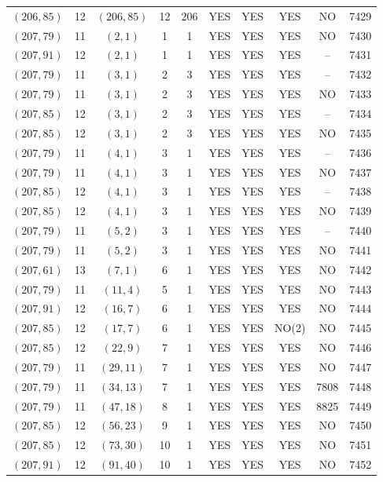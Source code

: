 \begin{longtable}{|c|c|c|c|c|c|c|c|c|c|}
$(206, 85)$ & 12 & $(206, 85)$ & 12 & 206 & YES & YES & YES & NO & 7429\\
$(207, 79)$ & 11 & $(2, 1)$ & 1 & 1 & YES & YES & YES & NO & 7430\\
$(207, 91)$ & 12 & $(2, 1)$ & 1 & 1 & YES & YES & YES & -- & 7431\\
$(207, 79)$ & 11 & $(3, 1)$ & 2 & 3 & YES & YES & YES & -- & 7432\\
$(207, 79)$ & 11 & $(3, 1)$ & 2 & 3 & YES & YES & YES & NO & 7433\\
$(207, 85)$ & 12 & $(3, 1)$ & 2 & 3 & YES & YES & YES & -- & 7434\\
$(207, 85)$ & 12 & $(3, 1)$ & 2 & 3 & YES & YES & YES & NO & 7435\\
$(207, 79)$ & 11 & $(4, 1)$ & 3 & 1 & YES & YES & YES & -- & 7436\\
$(207, 79)$ & 11 & $(4, 1)$ & 3 & 1 & YES & YES & YES & NO & 7437\\
$(207, 85)$ & 12 & $(4, 1)$ & 3 & 1 & YES & YES & YES & -- & 7438\\
$(207, 85)$ & 12 & $(4, 1)$ & 3 & 1 & YES & YES & YES & NO & 7439\\
$(207, 79)$ & 11 & $(5, 2)$ & 3 & 1 & YES & YES & YES & -- & 7440\\
$(207, 79)$ & 11 & $(5, 2)$ & 3 & 1 & YES & YES & YES & NO & 7441\\
$(207, 61)$ & 13 & $(7, 1)$ & 6 & 1 & YES & YES & YES & NO & 7442\\
$(207, 79)$ & 11 & $(11, 4)$ & 5 & 1 & YES & YES & YES & NO & 7443\\
$(207, 91)$ & 12 & $(16, 7)$ & 6 & 1 & YES & YES & YES & NO & 7444\\
$(207, 85)$ & 12 & $(17, 7)$ & 6 & 1 & YES & YES & NO(2) & NO & 7445\\
$(207, 85)$ & 12 & $(22, 9)$ & 7 & 1 & YES & YES & YES & NO & 7446\\
$(207, 79)$ & 11 & $(29, 11)$ & 7 & 1 & YES & YES & YES & NO & 7447\\
$(207, 79)$ & 11 & $(34, 13)$ & 7 & 1 & YES & YES & YES & 7808 & 7448\\
$(207, 79)$ & 11 & $(47, 18)$ & 8 & 1 & YES & YES & YES & 8825 & 7449\\
$(207, 85)$ & 12 & $(56, 23)$ & 9 & 1 & YES & YES & YES & NO & 7450\\
$(207, 85)$ & 12 & $(73, 30)$ & 10 & 1 & YES & YES & YES & NO & 7451\\
$(207, 91)$ & 12 & $(91, 40)$ & 10 & 1 & YES & YES & YES & NO & 7452\\

\end{longtable}

